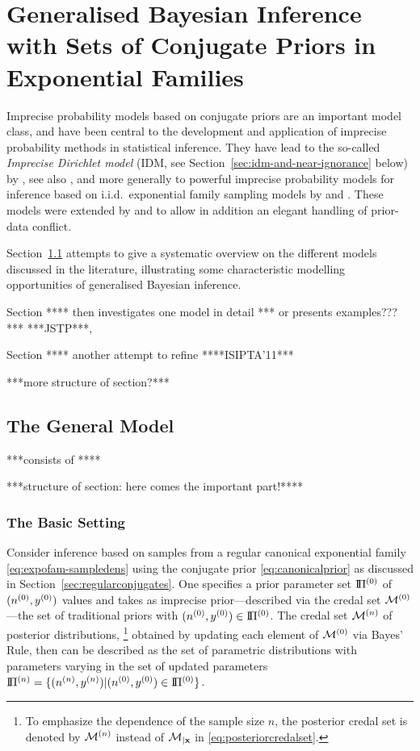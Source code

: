 \chapter{Generalised Bayesian Inference with Sets of Conjugate Priors in Exponential Families}
\label{cha:imprecisebayes-conjugate}

Imprecise probability models based on conjugate priors are an important model class,
and have been central to the development and application of imprecise probability methods
in statistical inference.
They have lead to the so-called \emph{Imprecise Dirichlet model} (IDM, see Section~\ref{sec:idm-and-near-ignorance} below)
by \textcite{1996:walley::idm}, see also \textcite{2009:bernard},
and more generally to powerful imprecise probability models for inference
based on i.i.d.\ exponential family sampling models by \textcite{2005:quaeghebeurcooman} and \textcite{2009:quaeghebeur::phd}.
These models were extended by \textcite{Walter2009a} and \textcite{Walter2011a}
to allow in addition an elegant handling of prior-data conflict.

Section~\ref{sec:generalmodel} attempts to give a systematic overview on the different models discussed in the literature,
illustrating some characteristic modelling opportunities of generalised Bayesian inference.

Section **** then investigates one model in detail *** or presents examples???*** ***JSTP***,

Section **** another attempt to refine ****ISIPTA'11***

***more structure of section?*** 

\section{The General Model}
\label{sec:generalmodel}

***consists of \textcite[\S 4.3]{itip-statinf}****

***structure of section: here comes the important part!****

\subsection{The Basic Setting}
\label{sec:basicsetting}

Consider inference based on samples from a regular canonical exponential family \eqref{eq:expofam-sampledens}
using the conjugate prior \eqref{eq:canonicalprior} as discussed in Section~\ref{sec:regularconjugates}.
One specifies a prior parameter set $\text{I}\!\Pi^{(0)}$ of $(n^{(0)},y^{(0)})$ values
and takes as imprecise prior---described via the credal set $\mathcal{M}^{(0)}$---the set of traditional priors with $(n^{(0)}, y^{(0)}) \in \text{I}\!\Pi^{(0)}$.
The credal set $\mathcal{M}^{(n)}$ of posterior distributions,%
\footnote{To emphasize the dependence of the sample size $n$,
the posterior credal set is denoted by $\mathcal{M}^{(n)}$ instead of $\mathcal{M}_{\vert \mathbf{x}}$ in \eqref{eq:posteriorcredalset}.}
obtained by updating each element of $\mathcal{M}^{(0)}$ via Bayes' Rule,
then can be described as the set of parametric distributions
with parameters varying in the set of updated parameters $\text{I}\!\Pi^{(n)} = \{(n^{(n)},y^{(n)}) \vert (n^{(0)}, y^{(0)}) \in \text{I}\!\Pi^{(0)}\}$.


